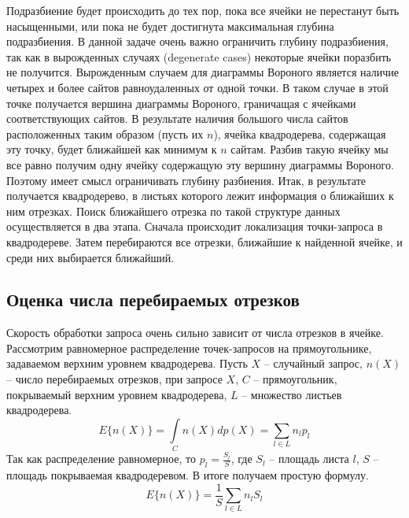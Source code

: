 
Подразбиение будет происходить до тех пор, пока все ячейки не
перестанут быть насыщенными, или пока не будет достигнута максимальная
глубина подразбиения. В данной задаче очень важно ограничить глубину
подразбиения, так как в вырожденных случаях (degenerate cases) некоторые
ячейки поразбить не получится. Вырожденным случаем для диаграммы
Вороного является наличие четырех и более сайтов равноудаленных от одной
точки. В таком случае в этой точке получается вершина диаграммы Вороного,
граничащая с ячейками соответствующих сайтов. В результате наличия
большого числа сайтов расположенных таким образом (пусть их $n$), ячейка
квадродерева, содержащая эту точку, будет ближайшей как минимум к $n$
сайтам. Разбив такую ячейку мы все равно получим одну ячейку содержащую
эту вершину диаграммы Вороного. Поэтому имеет смысл ограничивать
глубину разбиения.
Итак, в результате получается квадродерево, в листьях которого лежит
информация о ближайших к ним отрезках. Поиск ближайшего отрезка по такой
структуре данных осуществляется в два этапа. Сначала происходит
локализация точки-запроса в квадродереве. Затем перебираются все отрезки,
ближайшие к найденной ячейке, и среди них выбирается ближайший.

\FloatBarrier
\subsection{Оценка числа перебираемых отрезков}
Скорость обработки запроса очень сильно зависит от числа отрезков в ячейке.
Рассмотрим равномерное распределение точек-запросов на прямоугольнике,
задаваемом верхним уровнем квадродерева. Пусть $X$ -- случайный запрос, 
$n(X)$ -- число перебираемых отрезков, при запросе $X$, $C$ -- прямоугольник, 
покрываемый верхним уровнем квадродерева, $L$ -- множество листьев квадродерева.
\begin{equation}
E\{n(X)\} = \int\limits_Cn(X)dp(X) =  \sum\limits_{l \in L}n_lp_l
\end{equation}
Так как распределение равномерное, то $p_l = \frac{S_l}{S}$, где 
$S_l$ -- площадь листа $l$, $S$ -- площадь покрываемая квадродеревом.
В итоге получаем простую формулу.
\begin{equation}
E\{n(X)\} = \frac{1}{S}\sum\limits_{l \in L}n_lS_l
\end{equation}

